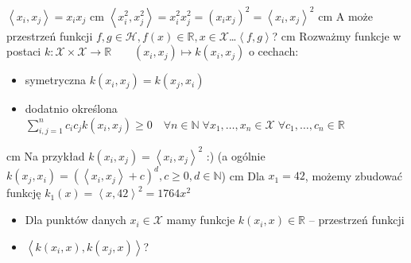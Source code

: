 \documentclass[11pt, xcolor={dvipsnames,svgnames},aspectratio=169]{beamer}
\theoremstyle{plain}
\theoremstyle{plain}
\begin{document}
\begin{frame}
	$\left\langle x_i, x_j \right\rangle = x_ix_j$\pause {} cm 
	$\left\langle x_i^2, x_j^2 \right\rangle = x_i^2x_j^2 = (x_ix_j)^2 = \left\langle x_i, x_j \right\rangle^2$\pause {} cm
	A może przestrzeń funkcji $f,g\in\mathcal{H}, f(x)\in\mathbb{R}, x \in\mathcal{X}$\dots $\left\langle f, g \right\rangle$?\pause {} cm
	Rozważmy funkcje w postaci $k: \mathcal{X} \times \mathcal{X} \rightarrow \mathbb{R}\qquad (x_i, x_j) \mapsto k(x_i, x_j)$ o cechach:
	\begin{itemize}
		\item symetryczna $k(x_i, x_j) = k(x_j, x_i)$
		\item dodatnio określona $\sum_{i,j=1}^n c_ic_j k(x_i, x_j) \geq 0  \quad \forall n \in \mathbb{N}\; \forall x_1,\dots,x_n\in\mathcal{X}\; \forall c_1, \dots, c_n \in\mathbb{R}$
	\end{itemize}\pause {} cm
	Na przykład $k(x_i, x_j) = \left\langle x_i, x_j \right\rangle^2$ :) \hskip 1cm (a ogólnie $k(x_j, x_i) = \left(\left\langle x_i, x_j \right\rangle + c\right)^d, c\geq 0, d\in\mathbb{N}$)\pause {} cm 
	Dla $x_1 = 42$, możemy zbudować funkcję $k_1(x) = \left\langle x, 42 \right\rangle^2 = 1764x^2$\pause
	\begin{itemize}
		\item Dla punktów danych $x_i\in\mathcal{X}$ mamy funkcje $k(x_i, x)\in\mathbb{R}$ -- przestrzeń funkcji
		\item  $\left\langle k(x_i, x), k(x_j, x) \right\rangle$?
	\end{itemize}
\end{frame}
\end{document}

